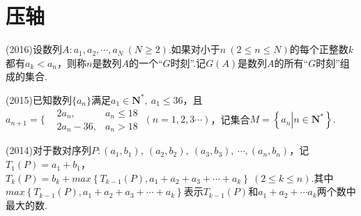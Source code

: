 \documentclass{BHCexam}
\begin{document}
\section{压轴}
\begin{questions}
\qs (2016)设数列$ A:a_1,a_2,\cdots,a_N~(N\ge2) $.如果对小于$ n~(2\le n\le N) $的每个正整数$ k $都有$ a_k<a_n $，则称$ n $是数列$ A $的一个“$ G $时刻”.记$ G(A) $是数列$ A $的所有“$ G $时刻”组成的集合.

\newpage
\qs (2015)已知数列$\{a_n\}$满足$ a_1\in\mathbf{N^*} ,~a_1\le 36$，且$ a_{n+1}=\Bigg\{\begin{aligned}
&2a_n,&a_n\le18\\
&2a_{n}-36,&a_n>18
\end{aligned} ~(n=1,2,3\cdots)$，记集合$ M=\left\{a_n\left|n\in \mathbf{N^*}\right.\right\} .$
\newpage
\qs (2014)对于数对序列$ P:(a_1,b_1),~(a_2,b_2),~(a_3,b_3),~\cdots,(a_n,b_n) $，记$ T_1(P)=a_1+b_1 $，$ T_k(P)=b_k+max\left\{T_{k-1}(P),a_1+a_2+a_3+\cdots+a_k\right\}~(2\le k\le n) $.其中$max\left\{T_{k-1}(P),a_1+a_2+a_3+\cdots+a_k\right\}$表示$ T_{k-1}(P) $和$ a_1+a_2+\cdots a_k $两个数中最大的数.
\begin{parts}

\end{parts}
\end{questions}
\end{document}
